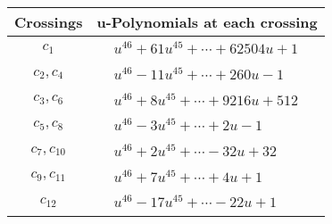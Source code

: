 \documentclass[1p]{elsarticle_modified}
\theoremstyle{definition}
\begin{document}
\begin{tabular}{m{50pt}|m{274pt}}
Crossings & \hspace{64pt}u-Polynomials at each crossing \\
\hline $$\begin{aligned}c_{1}\end{aligned}$$&$\begin{aligned}
&u^{46}+61 u^{45}+\cdots+62504 u+1
\end{aligned}$\\
\hline $$\begin{aligned}c_{2},c_{4}\end{aligned}$$&$\begin{aligned}
&u^{46}-11 u^{45}+\cdots+260 u-1
\end{aligned}$\\
\hline $$\begin{aligned}c_{3},c_{6}\end{aligned}$$&$\begin{aligned}
&u^{46}+8 u^{45}+\cdots+9216 u+512
\end{aligned}$\\
\hline $$\begin{aligned}c_{5},c_{8}\end{aligned}$$&$\begin{aligned}
&u^{46}-3 u^{45}+\cdots+2 u-1
\end{aligned}$\\
\hline $$\begin{aligned}c_{7},c_{10}\end{aligned}$$&$\begin{aligned}
&u^{46}+2 u^{45}+\cdots-32 u+32
\end{aligned}$\\
\hline $$\begin{aligned}c_{9},c_{11}\end{aligned}$$&$\begin{aligned}
&u^{46}+7 u^{45}+\cdots+4 u+1
\end{aligned}$\\
\hline $$\begin{aligned}c_{12}\end{aligned}$$&$\begin{aligned}
&u^{46}-17 u^{45}+\cdots-22 u+1
\end{aligned}$\\
\hline
\end{tabular}\\~\\
\newpage\renewcommand{\arraystretch}{1}
\end{document}
